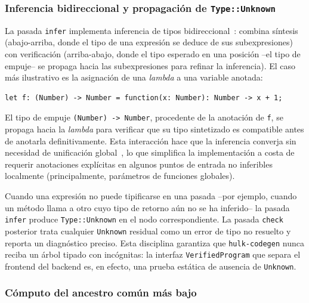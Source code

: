 \documentclass[12pt, a4paper]{article}
\begin{document}
\subsubsection{Inferencia bidireccional y propagación de \texttt{Type::Unknown}}

La pasada \texttt{infer} implementa inferencia de tipos bidireccional~\cite{pierce2002}: 
combina síntesis (abajo-arriba, donde el tipo de una expresión se deduce de sus subexpresiones) 
con verificación (arriba-abajo, donde el tipo esperado en una posición --el tipo de
empuje-- se propaga hacia las subexpresiones para refinar la inferencia). El caso más 
ilustrativo es la asignación de una \textit{lambda} a una variable anotada:

\begin{lstlisting}[caption={Inferencia bidireccional en asignación de lambda},
                   label=lst:bidir-infer]
let f: (Number) -> Number = function(x: Number): Number -> x + 1;
\end{lstlisting}

El tipo de empuje \texttt{(Number) -> Number}, procedente de la anotación de
\texttt{f}, se propaga hacia la \textit{lambda} para verificar que su tipo sintetizado
es compatible antes de anotarla definitivamente. Esta interacción hace que la
inferencia converja sin necesidad de unificación global~\cite{milner1978}, lo que 
simplifica la implementación a costa de requerir anotaciones explícitas en algunos 
puntos de entrada no inferibles localmente (principalmente, parámetros de funciones globales).

Cuando una expresión no puede tipificarse en una pasada --por ejemplo, cuando
un método llama a otro cuyo tipo de retorno aún no se ha inferido-- la pasada
\texttt{infer} produce \texttt{Type::Unknown} en el nodo correspondiente. La
pasada \texttt{check} posterior trata cualquier \texttt{Unknown} residual como
un error de tipo no resuelto y reporta un diagnóstico preciso. Esta
disciplina garantiza que \texttt{hulk-codegen} nunca reciba un árbol tipado
con incógnitas: la interfaz \texttt{VerifiedProgram} que separa el frontend del
backend es, en efecto, una prueba estática de ausencia de \texttt{Unknown}.

\subsubsection{Cómputo del ancestro común más bajo}
\end{document}
